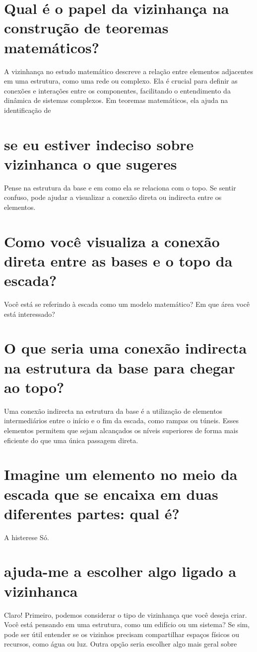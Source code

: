 \documentclass[11pt,a4paper]{article}
\begin{document}
\section{Qual é o papel da vizinhança na construção de teoremas matemáticos?}
A vizinhança no estudo matemático descreve a relação entre elementos adjacentes em uma estrutura, como uma rede ou complexo. Ela é crucial para definir as conexões e interações entre os componentes, facilitando o entendimento da dinâmica de sistemas complexos. Em teoremas matemáticos, ela ajuda na identificação de

\section{se eu estiver indeciso sobre vizinhanca o que sugeres}
Pense na estrutura da base e em como ela se relaciona com o topo. Se sentir confuso, pode ajudar a visualizar a conexão direta ou indirecta entre os elementos.

\section{Como você visualiza a conexão direta entre as bases e o topo da escada?}
Você está se referindo à escada como um modelo matemático? Em que área você está interessado?

\section{O que seria uma conexão indirecta na estrutura da base para chegar ao topo?}
Uma conexão indirecta na estrutura da base é a utilização de elementos intermediários entre o início e o fim da escada, como rampas ou túneis. Esses elementos permitem que sejam alcançados os níveis superiores de forma mais eficiente do que uma única passagem direta.

\section{Imagine um elemento no meio da escada que se encaixa em duas diferentes partes: qual é?}
A histerese Só.

\section{ajuda-me a escolher algo ligado a vizinhanca}
Claro! Primeiro, podemos considerar o tipo de vizinhança que você deseja criar. Você está pensando em uma estrutura, como um edifício ou um sistema? Se sim, pode ser útil entender se os vizinhos precisam compartilhar espaços físicos ou recursos, como água ou luz. Outra opção seria escolher algo mais geral sobre
\end{document}
